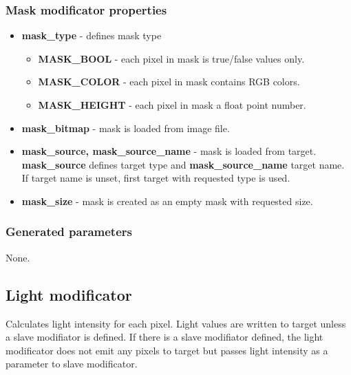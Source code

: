 \documentclass[9pt]{article}
\begin{document}
\subsubsection*{Mask modificator properties}
\begin{itemize}
\item{\bf mask\_type} - defines mask type
\begin{itemize}
\item{\bf MASK\_BOOL} - each pixel in mask is true/false values only.
\item{\bf MASK\_COLOR} - each pixel in mask contains RGB colors.
\item{\bf MASK\_HEIGHT} - each pixel in mask a float point number.
\end{itemize}
\item{\bf mask\_bitmap} - mask is loaded from image file.
\item{\bf mask\_source, mask\_source\_name} - mask is loaded from target. 
{\bf mask\_source} defines target type and {\bf mask\_source\_name} target name. 
If target name is unset, first target with requested type is used.
\item{\bf mask\_size} - mask is created as an empty mask with requested size.
\end{itemize}

\subsubsection*{Generated parameters}

None.

\newpage
\subsection{Light modificator}

Calculates light intensity for each pixel. Light values are written to target 
unless a slave modifiator is defined. If there is a slave modifiator defined, the
light modificator does not emit any pixels to target but passes light intensity as 
a parameter to slave modificator.
\end{document}
